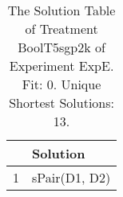 \begin{table}[ht]
\centering
\begin{tabular}{rp{9cm}}
  \hline
 & Solution \\ 
  \hline
1 & sPair(D1, D2) \\ 
   \hline
\end{tabular}
\caption{The Solution Table of Treatment BoolT5sgp2k of Experiment ExpE. Fit: 0. Unique Shortest Solutions: 13.} 
\end{table}

